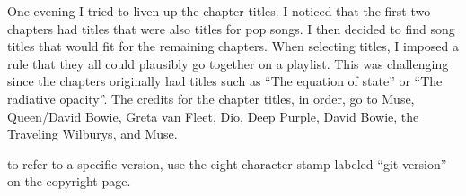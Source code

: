 One evening I tried to liven up the chapter titles. I noticed that the first two chapters had titles that were also titles for pop songs. I then decided to find song titles that would fit for the remaining chapters. When selecting titles, I imposed a rule that they all could plausibly go together on a playlist. This was challenging since the chapters originally had titles such as ``The equation of state'' or ``The radiative opacity''. The credits for the chapter titles, in order, go to Muse, Queen/David Bowie, Greta van Fleet, Dio, Deep Purple, David Bowie, the Traveling Wilburys, and Muse.

 to refer to a specific version, use the eight-character stamp labeled ``git version'' on the copyright page.
